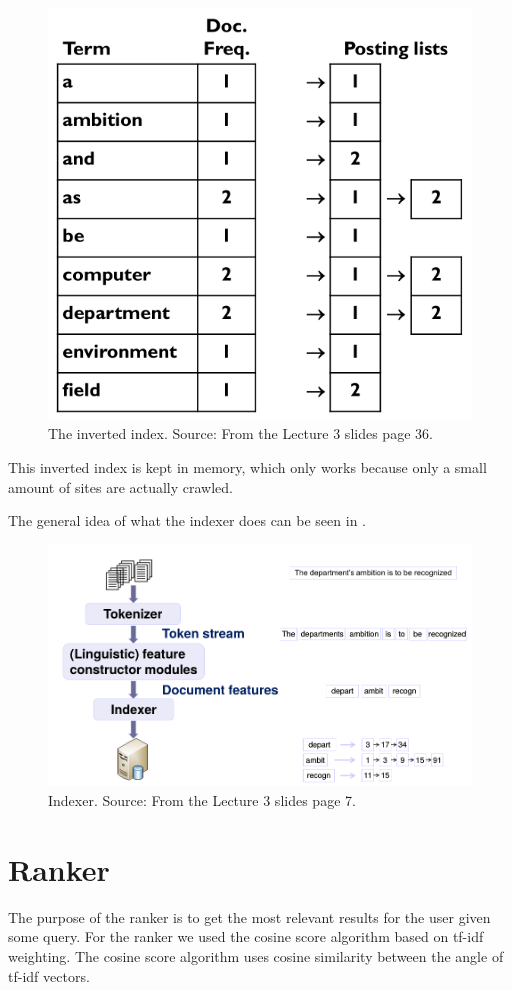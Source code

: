 	\begin{figure}[H]
	\centering
	\includegraphics[width=0.7\linewidth]{./Media/InvertedIndex}
	\caption{The inverted index. Source: From the Lecture 3 slides page 36.}
	\label{fig:InvertedIndex}
	\end{figure}
	
	This inverted index is kept in memory, which only works because only a small amount of sites are actually crawled.
	
	The general idea of what the indexer does can be seen in .
	
	\begin{figure}[H]
	\centering
	\includegraphics[width=0.7\linewidth]{./Media/indexer}
	\caption{Indexer. Source: From the Lecture 3 slides page 7.}
	\label{fig:indexer}
	\end{figure}
	
	\section{Ranker}
	The purpose of the ranker is to get the most relevant results for the user given some query.
	For the ranker we used the cosine score algorithm based on tf-idf weighting.
	The cosine score algorithm uses cosine similarity between the angle of tf-idf vectors.
	

